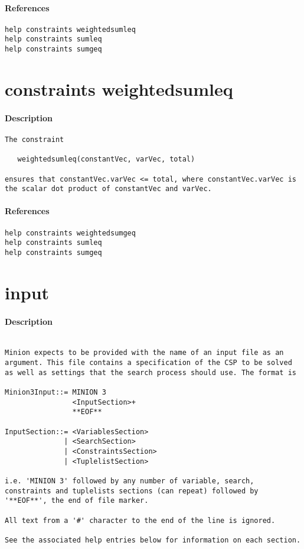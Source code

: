 \paragraph{References}
{\footnotesize
\begin{verbatim}
help constraints weightedsumleq
help constraints sumleq
help constraints sumgeq
\end{verbatim}
}
\section{constraints weightedsumleq}
\paragraph{Description}
{\footnotesize
\begin{verbatim}
The constraint

   weightedsumleq(constantVec, varVec, total)

ensures that constantVec.varVec <= total, where constantVec.varVec is
the scalar dot product of constantVec and varVec.
\end{verbatim}
}
\paragraph{References}
{\footnotesize
\begin{verbatim}
help constraints weightedsumgeq
help constraints sumleq
help constraints sumgeq
\end{verbatim}
}
\section{input}
\paragraph{Description}
{\footnotesize
\begin{verbatim}

Minion expects to be provided with the name of an input file as an
argument. This file contains a specification of the CSP to be solved
as well as settings that the search process should use. The format is

Minion3Input::= MINION 3
                <InputSection>+
                **EOF**

InputSection::= <VariablesSection> 
              | <SearchSection>
              | <ConstraintsSection> 
              | <TuplelistSection>

i.e. 'MINION 3' followed by any number of variable, search,
constraints and tuplelists sections (can repeat) followed by
'**EOF**', the end of file marker.

All text from a '#' character to the end of the line is ignored.

See the associated help entries below for information on each section.
\end{verbatim}
}
